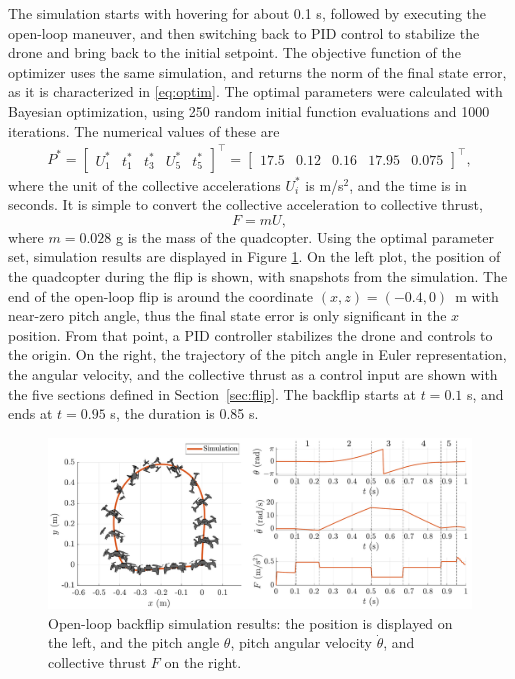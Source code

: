 The simulation starts with hovering for about 0.1 s, followed by executing the open-loop maneuver, and then switching back to PID control to stabilize the drone and bring back to the initial setpoint. The objective function of the optimizer uses the same simulation, and returns the norm of the final state error, as it is characterized in \eqref{eq:optim}. The optimal parameters were calculated with Bayesian optimization, using 250 random initial function evaluations and 1000 iterations. The numerical values of these are
\begin{align}\label{eq:optparam}
P^*=\begin{bmatrix}
U_1^* & t_1^* & t_3^* & U_5^*& t_5^*
\end{bmatrix} ^\top =  \begin{bmatrix}
17.5 & 0.12 & 0.16 & 17.95 & 0.075
\end{bmatrix}^\top,
\end{align}
where the unit of the collective accelerations $U_i^*$ is m/s$^2$, and the time is in seconds. It is simple to convert the collective acceleration to collective thrust, 
\begin{equation}
    F = m U,
\end{equation}
where $m = 0.028$ g is the mass of the quadcopter. Using the optimal parameter set, simulation results are displayed in Figure \ref{fig:opensimu}. On the left plot, the position of the quadcopter during the flip is shown, with snapshots from the simulation. The end of the open-loop flip is around the coordinate $(x, z)=(-0.4, 0)$~m with near-zero pitch angle, thus the final state error is only significant in the $x$ position. From that point, a PID controller stabilizes the drone and controls to the origin. On the right, the trajectory of the pitch angle in Euler representation, the angular velocity, and the collective thrust as a control input are shown with the five sections defined in Section~\ref{sec:flip}. The backflip starts at $t=0.1$ s, and ends at $t=0.95$ s, the duration is 0.85 s.

\begin{figure}
\centering
\includegraphics[width=\linewidth]{Fig/opensimu.pdf}
\caption{Open-loop backflip simulation results: the position is displayed on the left, and the pitch angle $\theta$, pitch angular velocity $\dot{\theta}$, and collective thrust $F$ on the right.}\label{fig:opensimu}
\end{figure}



